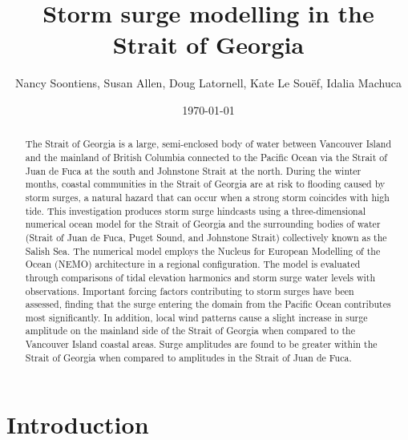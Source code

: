 \documentclass[pdftex,10pt]{article}
\title{Storm surge modelling in the Strait of Georgia}
\author{Nancy Soontiens, Susan Allen, Doug Latornell, Kate Le Sou\"{e}f, Idalia Machuca}
\date{\today}
\begin{document}
\maketitle

\begin{abstract}
The Strait of Georgia is a large, semi-enclosed body of water between Vancouver Island and the mainland of British Columbia connected to the Pacific Ocean via the Strait of Juan de Fuca at the south and Johnstone Strait at the north. During the winter months, coastal communities in the Strait of Georgia are at risk to flooding caused by storm surges, a natural hazard that can occur when a strong storm coincides with high tide. This investigation produces storm surge hindcasts using a three-dimensional numerical ocean model for the Strait of Georgia and the surrounding bodies of water (Strait of Juan de Fuca, Puget Sound, and Johnstone Strait) collectively known as the Salish Sea. The numerical model employs the Nucleus for European Modelling of the Ocean (NEMO) architecture in a regional configuration. The model is evaluated through comparisons of tidal elevation harmonics and storm surge water levels with observations. Important forcing factors contributing to storm surges have been assessed, finding that the surge entering the domain from the Pacific Ocean contributes most significantly. In addition, local wind patterns cause a slight increase in surge amplitude on the mainland side of the Strait of Georgia when compared to the Vancouver Island coastal areas. Surge amplitudes are found to be greater within the Strait of Georgia when compared to amplitudes in the Strait of Juan de Fuca. 
\end{abstract}

\section{Introduction}\label{sec:intro}
\end{document}
